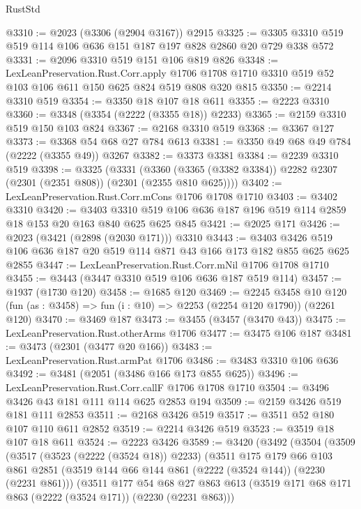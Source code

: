 \begin{lexlean}{RustStd}
\begin{coremodule}
{\begin{coremodule}
{{{{{{{{{{{{{@3310 := @2023 (@3306 (@2904 @3167)) @2915
@3325 := @3305 @3310 @519 @519 @114 @106 @636 @151 @187 @197 @828 @2860 @20 @729 @338 @572
@3331 := @2096 @3310 @519 @151 @106 @819 @826
@3348 := LexLeanPreservation.Rust.Corr.apply
    @1706
    @1708
    @1710
    @3310
    @519
    @52
    @103
    @106
    @611
    @150
    @625
    @824
    @519
    @808
    @320
    @815
@3350 := @2214 @3310 @519
@3354 := @3350 @18 @107 @18 @611
@3355 := @2223 @3310
@3360 := @3348 (@3354 (@2222 (@3355 @18)) @2233)
@3365 := @2159 @3310 @519 @150 @103 @824
@3367 := @2168 @3310 @519
@3368 := @3367 @127
@3373 := @3368 @54 @68 @27 @784 @613
@3381 := @3350 @49 @68 @49 @784 (@2222 (@3355 @49)) @3267
@3382 := @3373 @3381
@3384 := @2239 @3310 @519
@3398 := @3325
    (@3331 (@3360 (@3365 (@3382 @3384)) @2282 @2307 (@2301 (@2351 @808)) (@2301 (@2355 @810 @625))))
@3402 := LexLeanPreservation.Rust.Corr.mCons @1706 @1708 @1710
@3403 := @3402 @3310
@3420 := @3403 @3310 @519 @106 @636 @187 @196 @519 @114 @2859 @18 @153 @20 @163 @840 @625 @625 @845
@3421 := @2025 @171
@3426 := @2023 (@3421 (@2898 (@2030 @171))) @3310
@3443 := @3403 @3426 @519 @106 @636 @187 @20 @519 @114 @871 @43 @166 @173 @182 @855 @625 @625 @2855
@3447 := LexLeanPreservation.Rust.Corr.mNil @1706 @1708 @1710
@3455 := @3443 (@3447 @3310 @519 @106 @636 @187 @519 @114)
@3457 := @1937 (@1730 @120)
@3458 := @1685 @120
@3469 := @2245
    @3458
    @10
    @120
    (fun (as : @3458) => fun (i : @10) => @2253 (@2254 @120 @1790))
    (@2261 @120)
@3470 := @3469 @187
@3473 := @3455 (@3457 (@3470 @43))
@3475 := LexLeanPreservation.Rust.otherArms @1706
@3477 := @3475 @106 @187
@3481 := @3473 (@2301 (@3477 @20 @166))
@3483 := LexLeanPreservation.Rust.armPat @1706
@3486 := @3483 @3310 @106 @636
@3492 := @3481 (@2051 (@3486 @166 @173 @855 @625))
@3496 := LexLeanPreservation.Rust.Corr.callF @1706 @1708 @1710
@3504 := @3496 @3426 @43 @181 @111 @114 @625 @2853 @194
@3509 := @2159 @3426 @519 @181 @111 @2853
@3511 := @2168 @3426 @519
@3517 := @3511 @52 @180 @107 @110 @611 @2852
@3519 := @2214 @3426 @519
@3523 := @3519 @18 @107 @18 @611
@3524 := @2223 @3426
@3589 := @3420
    (@3492
      (@3504
        (@3509
          (@3517
            (@3523 (@2222 (@3524 @18)) @2233)
            (@3511
              @175
              @179
              @66
              @103
              @861
              @2851
              (@3519 @144 @66 @144 @861 (@2222 (@3524 @144)) (@2230 (@2231 @861)))
              (@3511
                @177
                @54
                @68
                @27
                @863
                @613
                (@3519 @171 @68 @171 @863 (@2222 (@3524 @171)) (@2230 (@2231 @863)))
}}}}}}}}}}}}}
\end{coremodule}}
\end{coremodule}
\end{lexlean}
